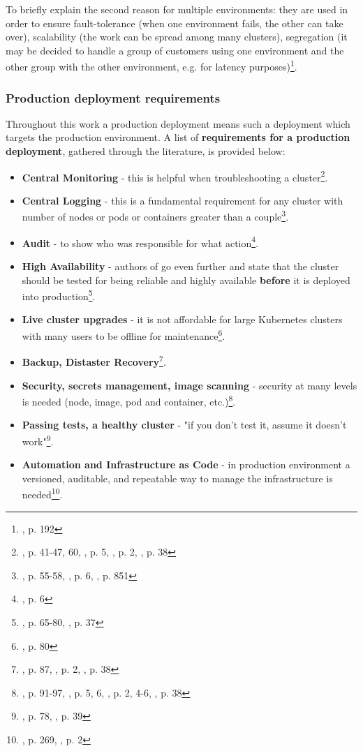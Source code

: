 To briefly explain the second reason for multiple environments: they are used in order to ensure fault-tolerance (when one environment fails, the other can take over), scalability (the work can be spread among many clusters), segregation (it may be decided to handle a group of customers using one environment and the other group with the other environment, e.g. for latency purposes)\footnote{\cite{book-iac}, p. 192}.

\subsubsection{Production deployment requirements}
Throughout this work a production deployment means such a deployment which targets the production environment. A list of \textbf{requirements for a production deployment}, gathered through the literature, is provided below:
\begin{itemize}
\item \textbf{Central Monitoring} - this is helpful when troubleshooting a cluster\footnote{\cite{book-mastering-k8s}, p. 41-47, 60, \cite{online-weave-checklists}, p. 5, \cite{online-weave-guide}, p. 2, \cite{book-cndwk}, p. 38}.
\item \textbf{Central Logging} - this is a fundamental requirement for any cluster with number of nodes or pods or containers greater than a couple\footnote{\cite{book-mastering-k8s}, p. 55-58, \cite{online-weave-checklists}, p. 6, \cite{book-devops-k8s}, p. 851}.
\item \textbf{Audit} - to show who was responsible for what action\footnote{\cite{online-weave-guide}, p. 6}.
\item \textbf{High Availability} - authors of \cite{book-mastering-k8s} go even further and state that the cluster should be tested for being reliable and highly available \textbf{before} it is deployed into production\footnote{\cite{book-mastering-k8s}, p. 65-80, \cite{book-cndwk}, p. 37}.
\item \textbf{Live cluster upgrades} - it is not affordable for large Kubernetes clusters with many users to be offline for maintenance\footnote{\cite{book-mastering-k8s}, p. 80}.
\item \textbf{Backup, Distaster Recovery}\footnote{\cite{book-mastering-k8s}, p. 87, \cite{online-weave-guide}, p. 2, \cite{book-cndwk}, p. 38}.
\item \textbf{Security, secrets management, image scanning} - security at many levels is needed (node, image, pod and container, etc.)\footnote{\cite{book-mastering-k8s}, p. 91-97, \cite{online-weave-checklists}, p. 5, 6, \cite{online-weave-guide}, p. 2, 4-6, \cite{book-cndwk}, p. 38}.
\item \textbf{Passing tests, a healthy cluster} - "if you don't test it, assume it doesn't work"\footnote{\cite{book-mastering-k8s}, p. 78, \cite{book-cndwk}, p. 39}.
\item \textbf{Automation and Infrastructure as Code} - in production environment a versioned, auditable, and repeatable way to manage the infrastructure is needed\footnote{\cite{book-mastering-k8s}, p. 269, \cite{online-weave-guide}, p. 2}.
\end{itemize}

